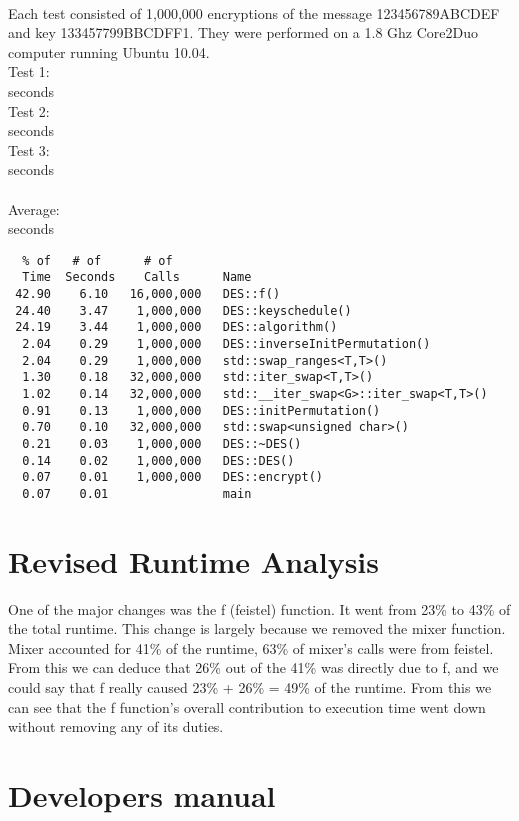 \documentclass[10pt]{article}
\begin{document}
\paragraph{}Each test consisted of 1,000,000 encryptions of the message 123456789ABCDEF and key 133457799BBCDFF1. They were performed on a 1.8 Ghz Core2Duo computer running Ubuntu 10.04.
\\Test 1:
\\  seconds
\\Test 2:
\\  seconds
\\Test 3:
\\  seconds
\\\\Average:
\\  seconds
\begin{verbatim}
  % of   # of      # of                  
  Time  Seconds    Calls      Name    
 42.90    6.10   16,000,000   DES::f()
 24.40    3.47    1,000,000   DES::keyschedule()
 24.19    3.44    1,000,000   DES::algorithm()
  2.04    0.29    1,000,000   DES::inverseInitPermutation()
  2.04    0.29    1,000,000   std::swap_ranges<T,T>()
  1.30    0.18   32,000,000   std::iter_swap<T,T>()
  1.02    0.14   32,000,000   std::__iter_swap<G>::iter_swap<T,T>()
  0.91    0.13    1,000,000   DES::initPermutation()
  0.70    0.10   32,000,000   std::swap<unsigned char>()
  0.21    0.03    1,000,000   DES::~DES()
  0.14    0.02    1,000,000   DES::DES()
  0.07    0.01    1,000,000   DES::encrypt()
  0.07    0.01                main
\end{verbatim}

\section{Revised Runtime Analysis}
  One of the major changes was the f (feistel) function. It went from 23\% to 43\% of the total runtime.  This change is largely because we removed the mixer function. Mixer accounted for 41\% of the runtime, 63\% of mixer's calls were from feistel.  From this we can deduce that 26\% out of the 41\% was directly due to f, and we could say that f really caused 23\% + 26\% = 49\% of the runtime.  From this we can see that the f function's overall contribution to execution time went down without removing any of its duties. 
\section{Developers manual}
\end{document}
